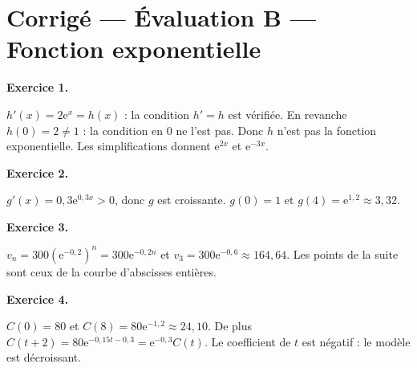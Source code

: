 \section*{Corrigé — Évaluation B — Fonction exponentielle}
\textbf{Exercice 1.}

$h'(x)=2\mathrm{e}^{x}=h(x)$ : la condition $h'=h$ est vérifiée. En revanche $h(0)=2\neq1$ : la condition en $0$ ne l'est pas. Donc $h$ n'est pas la fonction exponentielle. Les simplifications donnent $\mathrm{e}^{2x}$ et $\mathrm{e}^{-3x}$.

\textbf{Exercice 2.}

$g'(x)=0{,}3\mathrm{e}^{0{,}3x}>0$, donc $g$ est croissante. $g(0)=1$ et $g(4)=\mathrm{e}^{1{,}2}\approx3{,}32$.

\textbf{Exercice 3.}

$v_n=300(\mathrm{e}^{-0{,}2})^n=300\mathrm{e}^{-0{,}2n}$ et $v_3=300\mathrm{e}^{-0{,}6}\approx164{,}64$. Les points de la suite sont ceux de la courbe d'abscisses entières.

\textbf{Exercice 4.}

$C(0)=80$ et $C(8)=80\mathrm{e}^{-1{,}2}\approx24{,}10$. De plus $C(t+2)=80\mathrm{e}^{-0{,}15t-0{,}3}=\mathrm{e}^{-0{,}3}C(t)$. Le coefficient de $t$ est négatif : le modèle est décroissant.

